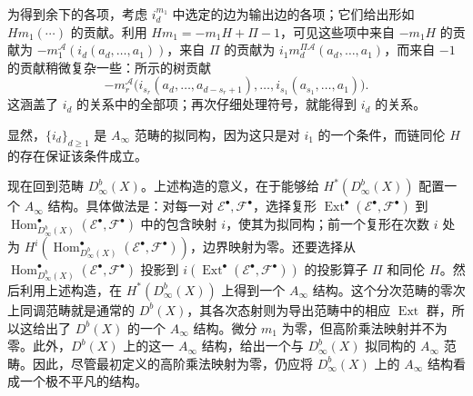 为得到余下的各项，考虑 $i_d^{m_1}$ 中选定的边为输出边的各项；它们给出形如 $Hm_1(\cdots)$ 的贡献。利用 $Hm_1=-m_1H+\Pi-1$，可见这些项中来自 $-m_1H$ 的贡献为 $-m_1^{\mathcal A}(i_d(a_d,\ldots,a_1))$，来自 $\Pi$ 的贡献为 $i_1m_d^{\Pi\mathcal A}(a_d,\ldots,a_1)$，而来自 $-1$ 的贡献稍微复杂一些：所示的树贡献
\[
-m_r^{\mathcal A}\bigl(i_{s_r}(a_d,\ldots,a_{d-s_r+1}),
\ldots,i_{s_1}(a_{s_1},\ldots,a_1)\bigr).
\]
这涵盖了 $i_d$ 的关系中的全部项；再次仔细处理符号，就能得到 $i_d$ 的关系。

\begin{figure}[H]
\centering
{}
\BookNumberOnlyCaption\label{fig:8.14}
\end{figure}

显然，$\{i_d\}_{d\geq1}$ 是 $A_\infty$ 范畴的拟同构，因为这只是对 $i_1$ 的一个条件，而链同伦 $H$ 的存在保证该条件成立。

现在回到范畴 $D^b_\infty(X)$。上述构造的意义，在于能够给 $H^*(D^b_\infty(X))$ 配置一个 $A_\infty$ 结构。具体做法是：对每一对 $\mathcal E^\bullet,\mathcal F^\bullet$，选择复形 $\operatorname{Ext}^\bullet(\mathcal E^\bullet,\mathcal F^\bullet)$ 到 $\operatorname{Hom}^\bullet_{D^b_\infty(X)}(\mathcal E^\bullet,\mathcal F^\bullet)$ 中的包含映射 $i$，使其为拟同构；前一个复形在次数 $i$ 处为 $H^i(\operatorname{Hom}^\bullet_{D^b_\infty(X)}(\mathcal E^\bullet,\mathcal F^\bullet))$，边界映射为零。还要选择从 $\operatorname{Hom}^\bullet_{D^b_\infty(X)}(\mathcal E^\bullet,\mathcal F^\bullet)$ 投影到 $i(\operatorname{Ext}^\bullet(\mathcal E^\bullet,\mathcal F^\bullet))$ 的投影算子 $\Pi$ 和同伦 $H$。然后利用上述构造，在 $H^*(D^b_\infty(X))$ 上得到一个 $A_\infty$ 结构。这个分次范畴的零次上同调范畴就是通常的 $D^b(X)$，其各次态射则为导出范畴中的相应 $\operatorname{Ext}$ 群，所以这给出了 $D^b(X)$ 的一个 $A_\infty$ 结构。微分 $m_1$ 为零，但高阶乘法映射并不为零。此外，$D^b(X)$ 上的这一 $A_\infty$ 结构，给出一个与 $D^b_\infty(X)$ 拟同构的 $A_\infty$ 范畴。因此，尽管最初定义的高阶乘法映射为零，仍应将 $D^b_\infty(X)$ 上的 $A_\infty$ 结构看成一个极不平凡的结构。

